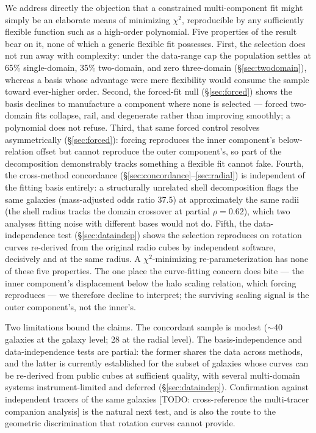 \documentclass[twocolumn]{aastex631}
\begin{document}
We address directly the objection that a constrained multi-component fit might
simply be an elaborate means of minimizing $\chi^2$, reproducible by any
sufficiently flexible function such as a high-order polynomial. Five properties of
the result bear on it, none of which a generic flexible fit possesses. First, the
selection does not run away with complexity: under the data-range cap the
population settles at 65\% single-domain, 35\% two-domain, and zero three-domain
(\S\ref{sec:twodomain}), whereas a basis whose advantage were mere flexibility
would consume the sample toward ever-higher order. Second, the forced-fit null
(\S\ref{sec:forced}) shows the basis declines to manufacture a component where
none is selected --- forced two-domain fits collapse, rail, and degenerate rather
than improving smoothly; a polynomial does not refuse. Third, that same forced
control resolves asymmetrically (\S\ref{sec:forced}): forcing reproduces the
inner component's below-relation offset but cannot reproduce the outer
component's, so part of the decomposition demonstrably tracks something a flexible
fit cannot fake. Fourth, the cross-method concordance
(\S\ref{sec:concordance}--\ref{sec:radial}) is independent of the fitting
basis entirely: a structurally unrelated shell decomposition flags the same
galaxies (mass-adjusted odds ratio 37.5) at approximately the same radii (the
shell radius tracks the domain crossover at partial $\rho = 0.62$), which two
analyses fitting noise with different bases would not do. Fifth, the
data-independence test (\S\ref{sec:dataindep}) shows the selection reproduces on
rotation curves re-derived from the original radio cubes by independent software,
decisively and at the same radius. A $\chi^2$-minimizing re-parameterization has
none of these five properties. The one place the curve-fitting concern does bite
--- the inner component's displacement below the halo scaling relation, which
forcing reproduces --- we therefore decline to interpret; the surviving scaling
signal is the outer component's, not the inner's.

Two limitations bound the claims. The concordant sample is modest
($\sim$40 galaxies at the galaxy level; 28 at the radial level). The
basis-independence and data-independence tests are partial: the former shares the
data across methods, and the latter is currently established for the subset of
galaxies whose curves can be re-derived from public cubes at sufficient quality,
with several multi-domain systems instrument-limited and deferred
(\S\ref{sec:dataindep}). Confirmation against independent tracers of the same
galaxies [TODO: cross-reference the multi-tracer companion analysis] is the
natural next test, and is also the route to the geometric discrimination that
rotation curves cannot provide.
\end{document}
